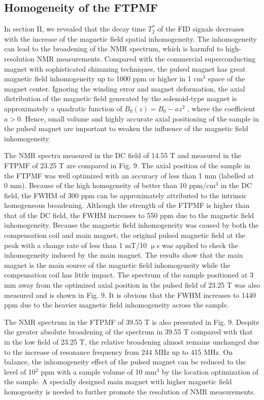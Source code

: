 \documentclass[lettersize,journal]{IEEEtran}
\begin{document}
\subsection{Homogeneity of the FTPMF}
In section II, we revealed that the decay time $T_{2}^{*}$ of the FID signals decreases with the increase of the magnetic field spatial inhomogeneity. The inhomogeneity can lead to the broadening of the NMR spectrum, which is harmful to high-resolution NMR measurements. Compared with the commercial superconducting magnet with sophisticated shimming techniques, the pulsed magnet has great magnetic field inhomogeneity up to 1000 ppm or higher in 1 cm$^3$ space of the magnet center. Ignoring the winding error and magnet deformation, the axial distribution of the magnetic field generated by the solenoid-type magnet is approximately a quadratic function of $B_0\left( z \right) =B_0-az^2$ , where the coefficient $a>0$. Hence, small volume and highly accurate axial positioning of the sample in the pulsed magnet are important to weaken the influence of the magnetic field inhomogeneity.

The NMR spectra measured in the DC field of 14.55 T and measured in the FTPMF of 23.25 T are compared in Fig. 9. The axial position of the sample in the FTPMF was well optimized with an accuracy of less than 1 mm (labelled at 0 mm). Because of the high homogeneity of better than 10 ppm/cm$^3$ in the DC field, the FWHM of 300 ppm can be approximately attributed to the intrinsic homogeneous broadening. Although the strength of the FTPMF is higher than that of the DC field, the FWHM increases to 550 ppm due to the magnetic field inhomogeneity. Because the magnetic field inhomogeneity was caused by both the compensation coil and main magnet, the original pulsed magnetic field at the peak with a change rate of less than 1 mT/10 $\upmu$s was applied to check the inhomogeneity induced by the main magnet. The results show that the main magnet is the main source of the magnetic field inhomogeneity while the compensation coil has little impact. The spectrum of the sample positioned at 3 mm away from the optimized axial position in the pulsed field of 23.25 T was also measured and is shown in Fig. 9. It is obvious that the FWHM increases to 1440 ppm due to the heavier magnetic field inhomogeneity across the sample.

The NMR spectrum in the FTPMF of 39.55 T is also presented in Fig. 9. Despite the greater absolute broadening of the spectrum in 39.55 T compared with that in the low field of 23.25 T, the relative broadening almost remains unchanged due to the increase of resonance frequency from 244 MHz up to 415 MHz. On balance, the inhomogeneity effect of the pulsed magnet can be reduced to the level of 10$^2$ ppm with a sample volume of 10 mm$^3$ by the location optimization of the sample. A specially designed main magnet with higher magnetic field homogeneity is needed to further promote the resolution of NMR measurements\cite{ref34}.
\end{document}
